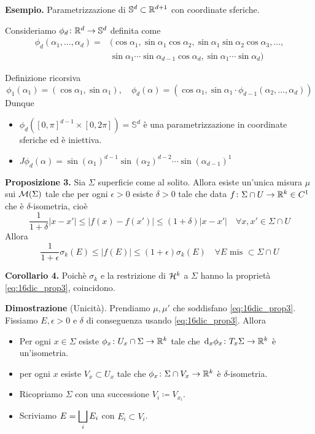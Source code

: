 \textbf{Esempio.} Parametrizzazione di $\mathbb{S}^d \subset \mathbb R^{d+1}$ con coordinate sferiche.

Consideriamo $\phi_d \colon \mathbb R^d \to \mathbb{S}^d$ definita come 
%
\begin{align*}
	\phi_d(\alpha_1,\ldots,\alpha_d) = & ( \cos \alpha_1, \sin \alpha_1 \cos \alpha_2, \sin \alpha_1 \sin \alpha_2 \cos \alpha_3,\ldots, \\
	& \sin \alpha_1 \cdots \sin \alpha_{d-1} \cos \alpha_d, \sin \alpha_1 \cdots \sin \alpha_d ) 
\end{align*}

Definizione ricorsiva
%
$$
\phi_1 (\alpha_1) = (\cos \alpha_1, \sin \alpha_1), \quad 
\phi_d(\alpha) = (\cos \alpha_1, \sin \alpha_1 \cdot \phi_{d-1}(\alpha_2,\ldots,\alpha_d))
$$
%
Dunque 
\begin{itemize}

	\item $\phi_d \left( [0,\pi]^{d-1} \times [0,2\pi] \right) = \mathbb{S}^d$ è una parametrizzazione in coordinate sferiche ed è iniettiva.

	\item $J\phi_d(\alpha) = \sin(\alpha_1)^{d-1} \sin(\alpha_2)^{d-2} \cdots \sin(\alpha_{d-1})^1$

\end{itemize}


\textbf{Proposizione 3.} Sia $\Sigma$ superficie come al solito. Allora esiste un'unica misura $\mu$ sui $\mathcal{M}(\Sigma)$ tale che per ogni $\epsilon > 0$ esiste $\delta > 0$ tale che data $f \colon \Sigma \cap U \to \mathbb R^k \in C^1$ che è $\delta$-isometria, cioè
%
\begin{equation}
	\label{eq:16dic_prop3} \tag{P}
	\frac{1}{1 + \delta} |x-x'| \leq |f(x) - f(x')| \leq (1+\delta)|x-x'| \quad \forall x,x' \in \Sigma \cap U
\end{equation}
Allora
%
$$
	\frac{1}{1+\epsilon} \sigma_k(E) \leq |f(E)| \leq (1+\epsilon)\sigma_k(E) \quad \forall E \text{ mis } \subset \Sigma \cap U
$$
%

\textbf{Corollario 4.} Poichè $\sigma_k$ e la restrizione di $\mathcal{H}^k$ a $\Sigma$ hanno la proprietà \eqref{eq:16dic_prop3}, coincidono.

\textbf{Dimostrazione} (Unicità). 
Prendiamo $\mu,\mu'$ che soddisfano \eqref{eq:16dic_prop3}.
Fissiamo $E,\epsilon > 0$ e $\delta$ di conseguenza usando \eqref{eq:16dic_prop3}. Allora
\begin{itemize}

	\item Per ogni $x \in \Sigma$ esiste $\phi_x \colon U_x \cap \Sigma \to \mathbb R^k$ tale che $\,\mathrm{d}_x \phi_x \colon T_x \Sigma \to \mathbb R^k$ è un'isometria.


	\item per ogni $x$ esiste $V_x \subset U_x$ tale che $\phi_x \colon \Sigma \cap V_x \to \mathbb R^k$ è $\delta$-isometria.


	\item Ricopriamo $\Sigma$ con una successione $V_i \coloneqq V_{x_i}$.


	\item Scriviamo $\displaystyle E = \bigsqcup_i E_i$ con $E_i \subset V_i$.

\end{itemize}
 
